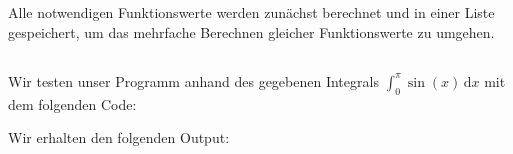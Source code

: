 \section{}





\subsection{}

Alle notwendigen Funktionswerte werden zunächst berechnet und in einer Liste gespeichert, um das mehrfache Berechnen gleicher Funktionswerte zu umgehen.







\subsection{}

Wir testen unser Programm anhand des gegebenen Integrals $\int_0^\pi \sin(x) \,\text{d}x$ mit dem folgenden Code:



Wir erhalten den folgenden Output:


